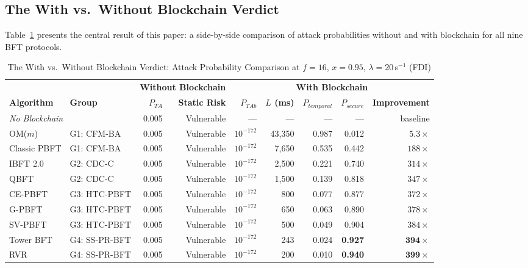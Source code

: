 \documentclass[10pt,twocolumn,letterpaper]{article}
\begin{document}
\subsection{The With vs.\ Without Blockchain Verdict}

Table~\ref{tab:verdict} presents the central result of this paper: a side-by-side comparison of attack probabilities without and with blockchain for all nine BFT protocols.

\begin{table}[t]
\caption{The With vs.\ Without Blockchain Verdict: Attack Probability Comparison at $f=16$, $x=0.95$, $\lambda=20$\,s$^{-1}$ (FDI)}
\label{tab:verdict}
\centering
\scriptsize
\begin{tabular}{@{}llrrrrrrr@{}}
\toprule
 & & \multicolumn{2}{c}{\textbf{Without Blockchain}} & \multicolumn{5}{c}{\textbf{With Blockchain}} \\
\cmidrule(lr){3-4} \cmidrule(lr){5-9}
\textbf{Algorithm} & \textbf{Group} & \textbf{$P_{TA}$} & \textbf{Static Risk} & \textbf{$P_{TAb}$} & \textbf{$L$ (ms)} & \textbf{$P_{temporal}$} & \textbf{$P_{secure}$} & \textbf{Improvement} \\
\midrule
\multicolumn{2}{l}{\emph{No Blockchain}} & 0.005 & Vulnerable & --- & --- & --- & --- & baseline \\
\midrule
OM($m$) & G1: CFM-BA & 0.005 & Vulnerable & $10^{-172}$ & 43,350 & 0.987 & 0.012 & $5.3\times$ \\
Classic PBFT & G1: CFM-BA & 0.005 & Vulnerable & $10^{-172}$ & 7,650 & 0.535 & 0.442 & $188\times$ \\
\midrule
IBFT 2.0 & G2: CDC-C & 0.005 & Vulnerable & $10^{-172}$ & 2,500 & 0.221 & 0.740 & $314\times$ \\
QBFT & G2: CDC-C & 0.005 & Vulnerable & $10^{-172}$ & 1,500 & 0.139 & 0.818 & $347\times$ \\
\midrule
CE-PBFT & G3: HTC-PBFT & 0.005 & Vulnerable & $10^{-172}$ & 800 & 0.077 & 0.877 & $372\times$ \\
G-PBFT & G3: HTC-PBFT & 0.005 & Vulnerable & $10^{-172}$ & 650 & 0.063 & 0.890 & $378\times$ \\
SV-PBFT & G3: HTC-PBFT & 0.005 & Vulnerable & $10^{-172}$ & 500 & 0.049 & 0.904 & $384\times$ \\
\midrule
Tower BFT & G4: SS-PR-BFT & 0.005 & Vulnerable & $10^{-172}$ & 243 & 0.024 & \textbf{0.927} & $\mathbf{394\times}$ \\
RVR & G4: SS-PR-BFT & 0.005 & Vulnerable & $10^{-172}$ & 200 & 0.010 & \textbf{0.940} & $\mathbf{399\times}$ \\
\bottomrule
\end{tabular}
\end{table}
\end{document}
